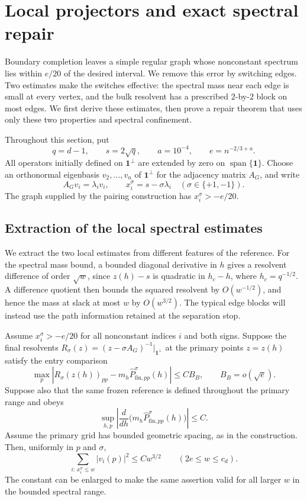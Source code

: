 \section{Local projectors and exact spectral repair}
\label{sec:exact-repair}

Boundary completion leaves a simple regular graph whose nonconstant spectrum
lies within $e/20$ of the desired interval.  We remove this error by switching
edges.  Two estimates make the switches effective: the spectral mass near each
edge is small at every vertex, and the bulk resolvent has a prescribed
$2$-by-$2$ block on most edges.  We first derive these estimates, then prove a
repair theorem that uses only these two properties and spectral confinement.

Throughout this section, put
\[
 q=d-1,\qquad s=2\sqrt q,\qquad a=10^{-4},\qquad
 e=n^{-2/3+a}.
\]
All operators initially defined on $\mathbf 1^\perp$ are extended by zero on
$\operatorname{span}\{\mathbf 1\}$.  Choose an orthonormal eigenbasis
$v_2,\ldots,v_n$ of $\mathbf 1^\perp$ for the adjacency matrix $A_G$, and write
\[
 A_Gv_i=\lambda_i v_i,\qquad x_i^\sigma=s-\sigma\lambda_i
 \quad (\sigma\in\{+1,-1\}).
\]
The graph supplied by the pairing construction has $x_i^\sigma>-e/20$.

\subsection{Extraction of the local spectral estimates}

We extract the two local estimates from different features of the reference.
For the spectral mass bound, a bounded diagonal derivative in $h$ gives a
resolvent difference of order $\sqrt w$, since $z(h)-s$ is quadratic in
$h_c-h$, where $h_c=q^{-1/2}$.  A difference quotient then bounds the
squared resolvent by $O(w^{-1/2})$, and hence the mass at slack at most $w$
by $O(w^{3/2})$.  The typical edge blocks will instead use the path
information retained at the separation stop.

\begin{lemma}
\label{lem:repair-projector}
Assume $x_i^\sigma>-e/20$ for all nonconstant indices $i$ and both signs.
Suppose the final resolvents
$R_\sigma(z)=(z-\sigma A_G)^{-1}|_{\mathbf 1^\perp}$ at the primary points
$z=z(h)$ satisfy the entry comparison
\[
 \max_p\left|
 R_\sigma(z(h))_{pp}-m_h\widehat P_{\mathrm{fin},pp}^\sigma(h)
 \right|\le C B_B,
 \qquad B_B=o(\sqrt e).
\]
Suppose also that the same frozen reference is defined throughout the primary
range and obeys
\[
 \sup_{h,p}\left|
 \frac{d}{dh}\bigl(m_h\widehat P_{\mathrm{fin},pp}^\sigma(h)\bigr)
 \right|\le C.
\]
Assume the primary grid has bounded geometric spacing, as in the construction.
Then, uniformly in $p$ and $\sigma$,
\begin{equation}
 \sum_{i:\,x_i^\sigma\le w}|v_i(p)|^2\le Cw^{3/2}
 \qquad (2e\le w\le c_d).
 \label{eq:original-61}
\end{equation}
The constant can be enlarged to make the same assertion valid for all larger
$w$ in the bounded spectral range.
\end{lemma}

